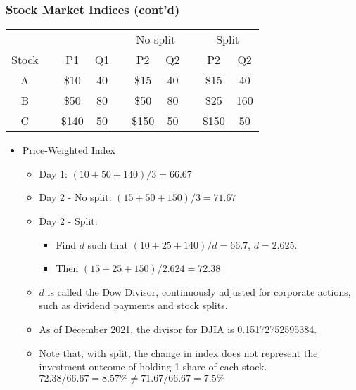 \documentclass[10pt]{beamer}
\begin{document}
	\begin{frame}[t]
		\frametitle{Stock Market Indices (cont'd)}
		
		\begin{table}[]
			\begin{tabular}{cccccccccc}
				& &  &  &  & \multicolumn{2}{c}{No split} & & \multicolumn{2}{c}{Split} \\ \cline{6-7} \cline{9-10} 
				Stock &  & P1    & Q1 &  & P2    & Q2  &  & P2    & Q2  \\ \cline{1-1} \cline{3-4} \cline{6-7} \cline{9-10} 
				A     &  & \$10  & 40 &  & \$15  & 40  &  & \$15  & 40  \\
				B     &  & \$50  & 80 &  & \$50  & 80 &  & \$25  & 160 \\
				C     &  & \$140 & 50 &  & \$150 & 50  &  & \$150 & 50 
			\end{tabular}
		\end{table}
		
		
		\begin{itemize}
			\item Price-Weighted Index	
			\begin{itemize}
				\item Day 1: $ (10 + 50 + 140)/3 = 66.67 $
				\item Day 2 - No split: $ (15 + 50 + 150)/3 = 71.67 $
				\item Day 2 - Split: 
				\begin{itemize}
					\item Find $d$ such that $ (10 + 25 + 140)/d = 66.7 $, $d=2.625$.
					\item Then $ (15 + 25 + 150)/2.624 = 72.38$
				\end{itemize}
				
				\item $d$ is called the Dow Divisor, continuously adjusted for corporate actions, such as dividend payments and stock splits.
				\item As of December 2021, the divisor for DJIA is 0.15172752595384.
				\item Note that, with split, the change in index does not represent the investment outcome of holding 1 share of each stock. $72.38/66.67 = 8.57\% \neq 71.67/66.67 = 7.5\% $
			\end{itemize}
			
		\end{itemize}
		
	\end{frame}
	
	
	
\end{document}
